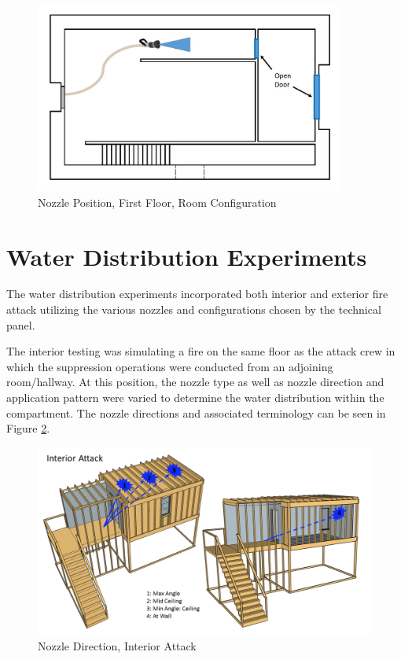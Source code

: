\documentclass{article}
\begin{document}
\begin{figure}[!ht]
	\centering
	\includegraphics[width=4in]{Figures/Air_Entrainment/Measurement_Location_Room_Configuration.jpg}
	\caption{Nozzle Position, First Floor, Room Configuration}
	\label{fig:Nozzle_Position_First_Floor_Room_Configuration}
\end{figure}

\section{Water Distribution Experiments}

The water distribution experiments incorporated both interior and exterior fire attack utilizing the various nozzles and configurations chosen by the technical panel. 

The interior testing was simulating a fire on the same floor as the attack crew in which the suppression operations were conducted from an adjoining room/hallway. At this position, the nozzle type as well as nozzle direction and application pattern were varied to determine the water distribution within the compartment. The nozzle directions and associated terminology can be seen in Figure \ref{fig:Nozzle_Direction_Interior_Attack}.

\begin{figure}[!ht]
	\centering
	\includegraphics[width=6in]{Figures/Water_Distribution/Nozzle_Position_Int.png}
	\caption{Nozzle Direction, Interior Attack}
	\label{fig:Nozzle_Direction_Interior_Attack}
\end{figure}
\end{document}
